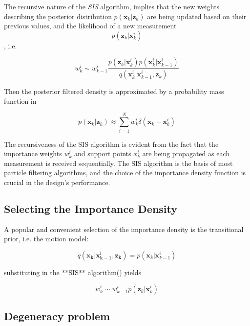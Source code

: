 The recursive nature of the \emph{SIS} algorithm, implies that the new weights describing the posterior distribution $p(\mathbf{x}_k | \mathbf{z}_k)$ are being updated based on their previous values, and the likelihood of a new measurement $$p(\mathbf{z}_k | \mathbf{x}_k^i)$$, i.e.

\begin{equation}\label{eq:SIS}
w_k^i \sim w_{k-1}^i \frac{p(\mathbf{z}_k | \mathbf{x}_k^i)p(\mathbf{x}_k^i | \mathbf{x}_{k-1}^i)}{q(\mathbf{x}_k^i | \mathbf{x}_{k-1}^i , \mathbf{z}_k)}
\end{equation}


Then the posterior filtered density is approximated by a probability mass function in 

\begin{equation}\label{eq:posterior_pmf}
p(\mathbf{x}_k | \mathbf{z}_k) \approx \sum_{i=1}^N w_k^i \delta(\mathbf{x}_k - \mathbf{x}_k^i)
\end{equation}


The recursiveness of the SIS algorithm is evident from the fact that the importance weights $w_k^i$ and support points $x_k^i$ are being propagated as each measurement is received sequentially. The SIS algorithm is the basis of most particle filtering algorithms, and the choice of the importance density function is crucial in the design's performance.

\subsection{Selecting the Importance Density}

A popular and convenient selection of the importance density is the transitional prior, i.e. the motion model\cite{Ristic2004}:

\begin{equation}\label{eq:SISmotmodel}
q(\mathbf{x_k | x_{k-1}^i , \mathbf{z}_k}) = p(\mathbf{x}_k | \mathbf{x}_{k-1}^i)
\end{equation}

substituting  in the **SIS** algorithm() yields 

\begin{equation}\label{eq:SIS2}
 w_k^i \sim w_{k-1}^i p(\mathbf{z}_k | \mathbf{x}_k^i)
\end{equation}


\subsection{Degeneracy problem}

